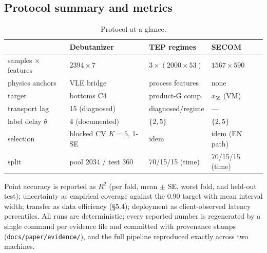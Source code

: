 \subsection{Protocol summary and metrics}


\begin{table}[t]
\centering\small
\caption{Protocol at a glance.}
\label{tab:t0}
\begin{tabular}{@{}llll@{}}
\toprule
 & Debutanizer & TEP regimes & SECOM \\
\midrule
samples $\times$ features & $2394 \times 7$ & $3\times(2000 \times 53)$ & $1567 \times 590$ \\
physics anchors & VLE bridge & process features & none \\
target & bottoms C4 & product-G comp. & $x_{59}$ (VM) \\
transport lag & 15 (diagnosed) & diagnosed/regime & --- \\
label delay $\theta$ & 4 (documented) & $\{2,5\}$ & $\{2,5\}$ \\
selection & blocked CV $K{=}5$, 1-SE & idem & idem (EN path) \\
split & pool 2034 / test 360 & 70/15/15 (time) & 70/15/15 (time) \\
\bottomrule
\end{tabular}
\end{table}

Point accuracy is reported as \(R^2\) (per fold, mean $\pm$ SE, worst fold, and held-out
test); uncertainty as empirical coverage against the 0.90 target with mean interval
width; transfer as data efficiency (\S 5.4); deployment as client-observed latency
percentiles. All runs are deterministic; every reported number is regenerated by a
single command per evidence file and committed with provenance stamps
(\texttt{docs/paper/evidence/}), and the full pipeline reproduced exactly across two machines.
